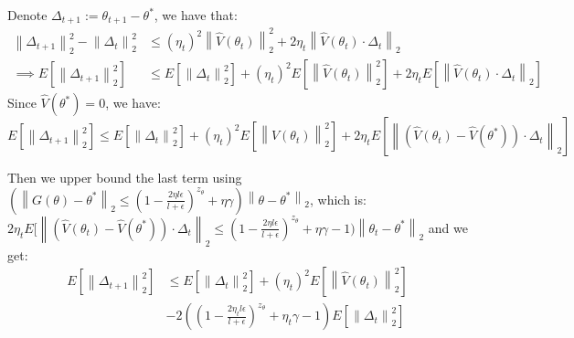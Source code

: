 \documentclass{beamer}
\begin{document}
\begin{frame}
  Denote $\Delta_{t+1}:= \theta_{t+1} - \theta^*$, we have that:
 \begin{equation}
   \begin{aligned}
     \left\lVert\Delta_{t+1}\right\lVert_2^2 - \left\lVert\Delta_{t}\right\lVert_2^2 & \leq (\eta_t)^2 \left\lVert\hat{V}(\theta_{t})\right\lVert_2^2 + 2\eta_t \left\lVert\hat{V}(\theta_{t}) \cdot \Delta_t \right\lVert_2 \\ \nonumber
   \implies E[ \left\lVert\Delta_{t+1}\right\lVert_2^2 ] & \leq E[\left\lVert\Delta_{t}\right\lVert_2^2] + (\eta_t)^2 E[\left\lVert\hat{V}(\theta_{t})\right\lVert_2^2] + 2\eta_t E[\left\lVert\hat{V}(\theta_{t}) \cdot \Delta_t \right\lVert_2 ]
    \end{aligned}
  \end{equation}
  Since $\hat{V}(\theta^*) = 0$, we have:$
    E[ \left\lVert\Delta_{t+1}\right\lVert_2^2 ]  \leq E[\left\lVert\Delta_{t}\right\lVert_2^2] + (\eta_t)^2 E[\left\lVert\hat{V}(\theta_{t})\right\lVert_2^2] + 2\eta_t E[\left\lVert(\hat{V}(\theta_{t}) -\hat{V}(\theta^*) )  \cdot \Delta_t \right\lVert_2 ]  \nonumber
    $

 Then we upper bound the last term using $(\left\lVert G(\theta) - \theta^*\right\lVert_2 \leq (1 - \frac{2\eta l \epsilon}{l+ \epsilon})^{z_{\theta}} + \eta \gamma)\left\lVert \theta - \theta^* \right\lVert_2$, which is: $2\eta_t E[\left\lVert(\hat{V}(\theta_{t}) -\hat{V}(\theta^*) )  \cdot \Delta_t \right\lVert_2 \leq (1 - \frac{2\eta l \epsilon}{l+ \epsilon})^{z_{\theta}} + \eta \gamma -1 )\left\lVert \theta_t - \theta^* \right\lVert_2$
  and we get:
  \begin{equation}
    \begin{aligned}
    E[ \left\lVert\Delta_{t+1}\right\lVert_2^2 ] & \leq E[\left\lVert\Delta_{t}\right\lVert_2^2] + (\eta_t)^2 E[\left\lVert\hat{V}(\theta_{t})\right\lVert_2^2]\\ & - 2((1 - \frac{2\eta_t l \epsilon}{l+ \epsilon})^{z_{\theta}} + \eta_t \gamma -1 )E[\left\lVert\Delta_t \right\lVert_2^2]  \nonumber
     \end{aligned}
   \end{equation}
\end{frame}
\end{document}
